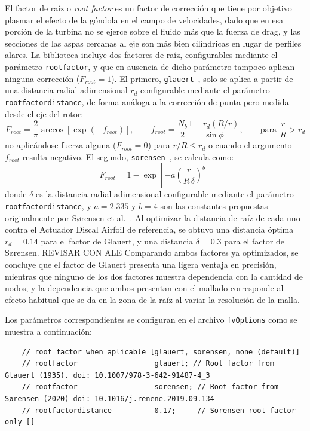 El factor de raíz o \textit{root factor} es un factor de corrección que tiene por objetivo plasmar el efecto de la góndola en el campo de velocidades, dado que en esa porción de la turbina no se ejerce sobre el fluido más que la fuerza de drag, y las secciones de las aspas cercanas al eje son más bien cilíndricas en lugar de perfiles alares. La biblioteca incluye dos factores de raíz, configurables mediante el parámetro \texttt{rootfactor}, y que en ausencia de dicho parámetro tampoco aplican ninguna corrección ($F_{root}=1$). El primero, \texttt{glauert}~\citep{glauert1935}, solo se aplica a partir de una distancia radial adimensional $r_d$ configurable mediante el parámetro \texttt{rootfactordistance}, de forma análoga a la corrección de punta pero medida desde el eje del rotor:
\begin{equation}
F_{root} = \frac{2}{\pi} \arccos\left[\exp(-f_{root})\right], \qquad f_{root} = \frac{N_b}{2}\frac{1-r_d(R/r)}{\sin\phi}, \qquad \text{para } \frac{r}{R} > r_d
\label{eq:root_glauert}
\end{equation}
no aplicándose fuerza alguna ($F_{root}=0$) para $r/R \leq r_d$ o cuando el argumento $f_{root}$ resulta negativo.
El segundo, \texttt{sorensen}~\citep{sorensen2020}, se calcula como:
\begin{equation}
F_{root} = 1 - \exp\left[-a\left(\frac{r}{R\,\delta}\right)^{b}\right]
\label{eq:root_sorensen}
\end{equation}
donde $\delta$ es la distancia radial adimensional configurable mediante el parámetro \texttt{rootfactordistance}, y $a=2.335$ y $b=4$ son las constantes propuestas originalmente por Sørensen et al.~\citep{sorensen2020}. Al optimizar la distancia de raíz de cada uno contra el Actuador Discal Airfoil de referencia, se obtuvo una distancia óptima $r_d = 0.14$ para el factor de Glauert, y una distancia $\delta = 0.3$ para el factor de Sørensen. {\Large REVISAR CON ALE} Comparando ambos factores ya optimizados, se concluye que el factor de Glauert presenta una ligera ventaja en precisión, mientras que ninguno de los dos factores muestra dependencia con la cantidad de nodos, y la dependencia que ambos presentan con el mallado corresponde al efecto habitual que se da en la zona de la raíz al variar la resolución de la malla.

Los parámetros correspondientes se configuran en el archivo \texttt{fvOptions} como se muestra a continuación:

\begin{scriptsize}
\begin{verbatim}
    // root factor when aplicable [glauert, sorensen, none (default)]
    // rootfactor                  glauert; // Root factor from Glauert (1935). doi: 10.1007/978-3-642-91487-4_3
    // rootfactor                  sorensen; // Root factor from Sørensen (2020) doi: 10.1016/j.renene.2019.09.134
    // rootfactordistance          0.17;     // Sorensen root factor only []
\end{verbatim}
\end{scriptsize}

